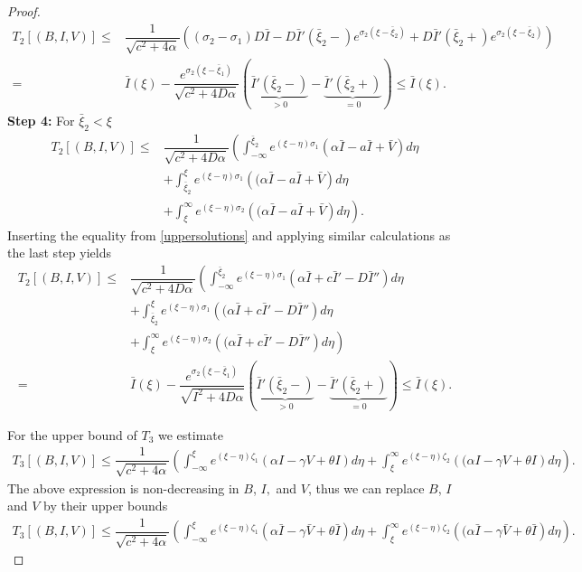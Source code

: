 \documentclass[11pt]{article}
\theoremstyle{definition}
\begin{document}
{\begin{proof}
\begin{align}
     T_2[(B,I,V)] \le & \dfrac{1}{\sqrt{c^2+4 \alpha}} \left( (\sigma_2-\sigma_1 )D \bar{I} -D \bar{I}'(\bar{\xi}_2-)e^{\sigma_2(\xi - \bar{\xi}_2)}+ D \bar{I}'(\bar{\xi}_2+)e^{\sigma_2(\xi - \bar{\xi}_2)} \right) \\ =& \bar{I}(\xi) - \dfrac{e^{\sigma_2(\xi- \bar{\xi}_1)}}{\sqrt{c^2+4D \alpha}}\left(\underbrace{\bar{I}'(\bar{\xi}_2-)}_{>0} - \underbrace{\bar{I}'(\bar{\xi}_2+)}_{=0} \right) \le \bar{I}(\xi).
     \end{align}
           \textbf{Step 4:} For $\bar{\xi}_2< \xi$\begin{align}
        T_2[(B,I,V)] \le & \dfrac{1}{\sqrt{c^2+4D \alpha}} \left( \int_{-\infty}^{\bar{\xi}_2} e^{(\xi- \eta)\sigma_1} {\left(\alpha \bar I-a\bar I+\bar V \right)}d \eta \right. \\ & + \left. \int_{\bar{\xi}_2}^{\xi} e^{(\xi- \eta)\sigma_1} {\left((\alpha \bar I-a\bar I+\bar V \right)}d \eta \right. \\&+ \left. \int_{\xi}^{\infty} e^{(\xi- \eta)\sigma_2} {\left((\alpha \bar I-a\bar I+\bar V \right)}d \eta \right).
    \end{align}
    Inserting the equality from \eqref{uppersolutions} and applying similar calculations as the last step yields
    \begin{align}
          T_2[(B,I,V)] \le & \dfrac{1}{\sqrt{c^2+4D \alpha}} \left( \int_{-\infty}^{\bar\xi_2} e^{(\xi- \eta)\sigma_1} {\left(\alpha \bar I+ c\bar I'-D\bar I'' \right)}d \eta \right. \\ & + \left. \int_{\bar\xi_2}^{{\xi}} e^{(\xi- \eta)\sigma_1} {\left((\alpha \bar I+ c\bar I'-D\bar I'' \right)}d \eta \right. \\&+ \left. \int_{\xi}^{\infty} e^{(\xi- \eta)\sigma_2} {\left((\alpha \bar I+ c\bar I'-D\bar I'' \right)}d \eta \right)\\ =& \bar{I}(\xi) - \dfrac{e^{\sigma_2(\xi- \bar{\xi}_1)}}{\sqrt{I^2+4D \alpha}}\left(\underbrace{\bar{I}'(\bar{\xi}_2-)}_{>0} - \underbrace{\bar{I}'(\bar{\xi}_2+)}_{=0} \right) \le \bar{I}(\xi).
    \end{align}

     For the upper bound of $T_3$ we estimate 
    \begin{align}
        T_3[(B,I,V)] \le \dfrac{1}{\sqrt{c^2+4 \alpha}} \left( \int_{-\infty}^{\xi} e^{(\xi- \eta)\zeta_1} {\left(\alpha  I-\gamma V +\theta I \right)}d \eta +  \int_{\xi}^{\infty} e^{(\xi- \eta)\zeta_2} {\left((\alpha  I-\gamma V +\theta I \right)}d \eta \right).
    \end{align}
    The above expression is non-decreasing in $B$, $I,$ and $V$, thus we can replace $B$, $I$ and $V$ by their upper bounds 
       \begin{align}
        T_3[(B,I,V)] \le \dfrac{1}{\sqrt{c^2+4 \alpha}} \left( \int_{-\infty}^{\xi} e^{(\xi- \eta)\zeta_1} {\left(\alpha \bar I-\gamma\bar V +\theta\bar I  \right)}d \eta +  \int_{\xi}^{\infty} e^{(\xi- \eta)\zeta_2} {\left((\alpha \bar I-\gamma\bar V +\theta\bar I \right)}d \eta \right).
    \end{align}


\end{proof}}
\end{document}
